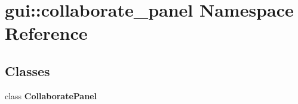 \section{gui::collaborate\_\-panel Namespace Reference}
\label{namespacegui_1_1collaborate__panel}


\subsection*{Classes}
\begin{CompactItemize}
\item 
class {\bf CollaboratePanel}
\end{CompactItemize}
